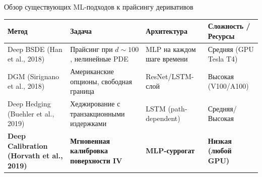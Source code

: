 \documentclass[aspectratio=169, 10pt]{beamer}
\begin{document}
\begin{frame}{Обзор существующих ML-подходов к прайсингу деривативов}
  \begin{center}\small
  \begin{tabular}{@{}p{2.8cm}p{3.4cm}p{2.6cm}p{3.4cm}@{}}
    \toprule
    \textbf{Метод} & \textbf{Задача} & \textbf{Архитектура} & \textbf{Сложность / Ресурсы} \\
    \midrule
    Deep BSDE \newline\tiny(Han et al., 2018)
      & Прайсинг при $d\!\sim\!100$, нелинейные PDE
      & MLP на каждом шаге времени
      & Средняя (GPU Tesla T4) \\
    \addlinespace
    DGM \newline\tiny(Sirignano et al., 2018)
      & Американские опционы, свободная граница
      & ResNet/LSTM-слой
      & Высокая (V100/A100) \\
    \addlinespace
    Deep Hedging \newline\tiny(Buehler et al., 2019)
      & Хеджирование с транзакционными издержками
      & LSTM (path-dependent)
      & Средняя/Высокая \\
    \addlinespace
    \rowcolor{hestonblue!12}
    \textbf{Deep Calibration} \newline\tiny\textbf{(Horvath et al., 2019)}
      & \textbf{Мгновенная калибровка поверхности IV}
      & \textbf{MLP-суррогат}
      & \textbf{Низкая (любой GPU)} \\
    \bottomrule
  \end{tabular}
  \end{center}


\end{frame}
\end{document}
